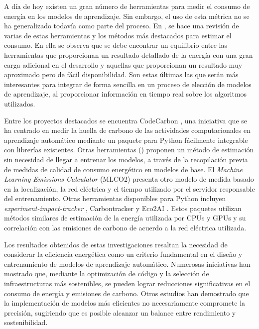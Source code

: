A día de hoy existen un gran número de herramientas para medir el consumo de energía en los modelos de aprendizaje. Sin embargo, el uso de esta métrica no se ha generalizado todavía como parte del proceso. En \citeauthor{eva2019review}, \citeyear{eva2019review} \cite{eva2019review} se hace una revisión de varias de estas herramientas y los métodos más destacados para estimar el consumo. En ella se observa que se debe encontrar un equilibrio entre las herramientas que proporcionan un resultado detallado de la energía con una gran carga adicional en el desarrollo y aquellas que proporcionan un resultado muy aproximado pero de fácil disponibilidad. Son estas últimas las que serán más interesantes para integrar de forma sencilla en un proceso de elección de modelos de aprendizaje, al proporcionar información en tiempo real sobre los algoritmos utilizados.



Entre los proyectos destacados se encuentra CodeCarbon \cite{codecarbon}, una iniciativa que se ha centrado en medir la huella de carbono de las actividades computacionales en aprendizaje automático mediante un paquete para Python fácilmente integrable con librerías existentes. Otras herramientas (\cite{getzner2023accuracy}) proponen un método de estimación sin necesidad de llegar a entrenar los modelos, a través de la recopilación previa de medidas de calidad de consumo energético en modelos de base. El \emph{Machine Learning Emissions Calculator} (MLCO2)\cite{lacoste2022mlco2} presenta otro modelo de medida basado en la localización, la red eléctrica y el tiempo utilizado por el servidor responsable del entrenamiento. Otras herramientas disponibles para Python incluyen \emph{experiment-impact-tracker} \cite{henderson2020tracker}, Carbontracker \cite{anthony2020carbontracker} y Eco2AI \cite{budennyy2022eco2ai}. Estos paquetes utilizan métodos similares de estimación de la energía utilizada por CPUs y GPUs y su correlación con las emisiones de carbono de acuerdo a la red eléctrica utilizada.

Los resultados obtenidos de estas investigaciones resaltan la necesidad de considerar la eficiencia energética como un criterio fundamental en el diseño y entrenamiento de modelos de aprendizaje automático. Numerosas iniciativas han mostrado que, mediante la optimización de código y la selección de infraestructuras más sostenibles, se pueden lograr reducciones significativas en el consumo de energía y emisiones de carbono. Otros estudios han demostrado que la implementación de modelos más eficientes no necesariamente compromete la precisión, sugiriendo que es posible alcanzar un balance entre rendimiento y sostenibilidad.

